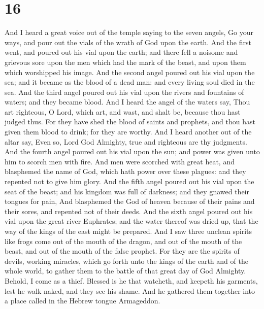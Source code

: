 \hypertarget{section-15}{%
\section{16}\label{section-15}}

 And I heard a great voice out of the temple saying to the
seven angels, Go your ways, and pour out the vials of the wrath of God
upon the earth.  And the first went, and poured out his vial
upon the earth; and there fell a noisome and grievous sore upon the men
which had the mark of the beast, and upon them which worshipped his
image.  And the second angel poured out his vial upon the
sea; and it became as the blood of a dead man: and every living soul
died in the sea.  And the third angel poured out his vial
upon the rivers and fountains of waters; and they became blood.
 And I heard the angel of the waters say, Thou art
righteous, O Lord, which art, and wast, and shalt be, because thou hast
judged thus.  For they have shed the blood of saints and
prophets, and thou hast given them blood to drink; for they are worthy.
 And I heard another out of the altar say, Even so, Lord God
Almighty, true and righteous are thy judgments.  And the
fourth angel poured out his vial upon the sun; and power was given unto
him to scorch men with fire.  And men were scorched with
great heat, and blasphemed the name of God, which hath power over these
plagues: and they repented not to give him glory.  And the
fifth angel poured out his vial upon the seat of the beast; and his
kingdom was full of darkness; and they gnawed their tongues for pain,
 And blasphemed the God of heaven because of their pains
and their sores, and repented not of their deeds.  And the
sixth angel poured out his vial upon the great river Euphrates; and the
water thereof was dried up, that the way of the kings of the east might
be prepared.  And I saw three unclean spirits like frogs
come out of the mouth of the dragon, and out of the mouth of the beast,
and out of the mouth of the false prophet.  For they are
the spirits of devils, working miracles, which go forth unto the kings
of the earth and of the whole world, to gather them to the battle of
that great day of God Almighty.  Behold, I come as a thief.
Blessed is he that watcheth, and keepeth his garments, lest he walk
naked, and they see his shame.  And he gathered them
together into a place called in the Hebrew tongue Armageddon.
